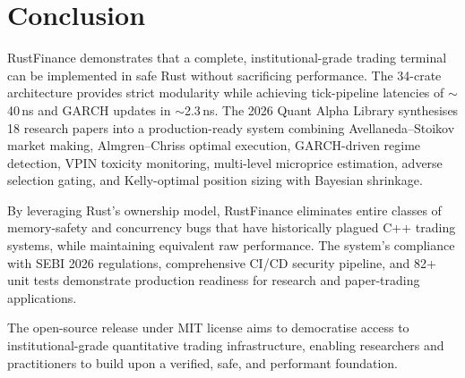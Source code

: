 \documentclass[11pt]{article}
\theoremstyle{definition}
\begin{document}
\section{Conclusion}
\label{sec:conclusion}

RustFinance demonstrates that a complete, institutional-grade trading
terminal can be implemented in safe Rust without sacrificing
performance. The 34-crate architecture provides strict modularity
while achieving tick-pipeline latencies of $\sim$40\,ns and
GARCH updates in $\sim$2.3\,ns. The 2026 Quant Alpha Library
synthesises 18 research papers into a production-ready system
combining Avellaneda--Stoikov market making, Almgren--Chriss optimal
execution, GARCH-driven regime detection, VPIN toxicity monitoring,
multi-level microprice estimation, adverse selection gating, and
Kelly-optimal position sizing with Bayesian shrinkage.

By leveraging Rust's ownership model, RustFinance eliminates entire
classes of memory-safety and concurrency bugs that have historically
plagued C++ trading systems, while maintaining equivalent raw
performance. The system's compliance with SEBI 2026 regulations,
comprehensive CI/CD security pipeline, and 82+ unit tests demonstrate
production readiness for research and paper-trading applications.

The open-source release under MIT license aims to democratise access
to institutional-grade quantitative trading infrastructure, enabling
researchers and practitioners to build upon a verified, safe, and
performant foundation.
\end{document}
